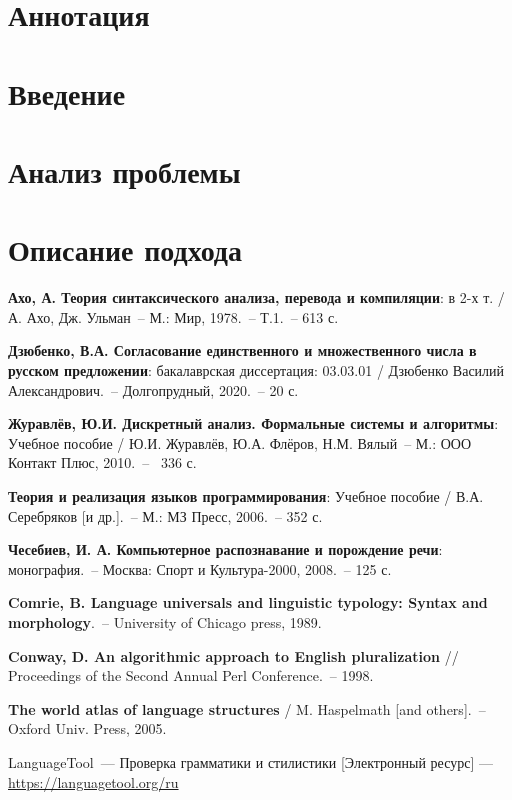 \documentclass[oneside, final, 12pt]{article}
\theoremstyle{plain}
\theoremstyle{plain} %
\begin{document}
\setcounter{page}{2}
\section*{Аннотация} 

\pagebreak

\tableofcontents


\pagebreak 

\section{Введение} 

\pagebreak
\section{Анализ проблемы}

\pagebreak
\section{Описание подхода}


\pagebreak


\begin{thebibliography}{500}
	
 \textbf{Ахо, А. Теория синтаксического анализа, перевода и компиляции}: в 2-х т. / А. Ахо, Дж. Ульман~-- М.: Мир, 1978.~-- Т.1.~-- 613 с.

\textbf{ Дзюбенко, В.А. Согласование единственного и множественного числа в русском предложении}: бакалаврская диссертация: 03.03.01 / Дзюбенко Василий Александрович.~-- Долгопрудный, 2020.~-- 20 с.

\textbf{ Журавлёв, Ю.И. Дискретный анализ. Формальные системы и алгоритмы}: Учебное пособие / Ю.И. Журавлёв, Ю.А. Флёров, Н.М. Вялый~-- М.: ООО Контакт Плюс, 2010.~--~ 336 с.

 \textbf{Теория и реализация языков программирования}: Учебное пособие / В.А. Серебряков [и др.].~-- М.: МЗ Пресс, 2006.~-- 352 с.

 \textbf{Чесебиев, И. А. Компьютерное распознавание и порождение речи}: монография.~-- Москва: Спорт и Культура-2000, 2008.~-- 125 с.

 \textbf{Comrie, B. Language universals and linguistic typology: Syntax and morphology}.~-- University of Chicago press, 1989.

 \textbf{Conway, D. An algorithmic approach to English pluralization} // Proceedings of the Second Annual Perl Conference.~-- 1998.

 \textbf{The world atlas of language structures} / M. Haspelmath [and others].~-- Oxford Univ. Press, 2005.

 LanguageTool~--- Проверка грамматики и стилистики [Электронный ресурс] --- \href{https://languagetool.org/ru}{https://languagetool.org/ru}


\end{thebibliography}
\pagebreak

\appendix


\end{document}
